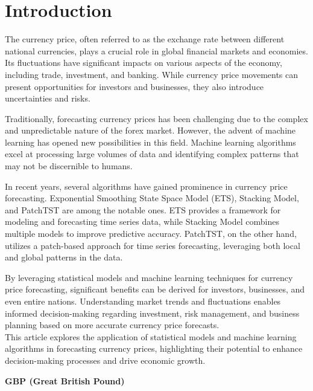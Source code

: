 \documentclass{ieeeojies}
\begin{document}
\section{Introduction}
\label{sec:introduction}
The currency price, often referred to as the exchange rate between different national currencies, plays a crucial role in global financial markets and economies. Its fluctuations have significant impacts on various aspects of the economy, including trade, investment, and banking. While currency price movements can present opportunities for investors and businesses, they also introduce uncertainties and risks.\par
\noindent
Traditionally, forecasting currency prices has been challenging due to the complex and unpredictable nature of the forex market. However, the advent of machine learning has opened new possibilities in this field. Machine learning algorithms excel at processing large volumes of data and identifying complex patterns that may not be discernible to humans.\par
\noindent
In recent years, several algorithms have gained prominence in currency price forecasting. Exponential Smoothing State Space Model (ETS), Stacking Model, and PatchTST are among the notable ones. ETS provides a framework for modeling and forecasting time series data, while Stacking Model combines multiple models to improve predictive accuracy. PatchTST, on the other hand, utilizes a patch-based approach for time series forecasting, leveraging both local and global patterns in the data.\par
\noindent
By leveraging statistical models and machine learning techniques for currency price forecasting, significant benefits can be derived for investors, businesses, and even entire nations. Understanding market trends and fluctuations enables informed decision-making regarding investment, risk management, and business planning based on more accurate currency price forecasts.\\
\noindent
This article explores the application of statistical models and machine learning algorithms in forecasting currency prices, highlighting their potential to enhance decision-making processes and drive economic growth.

\bigskip
\raggedright\textbf{GBP (Great British Pound)}
\bigskip
\end{document}
